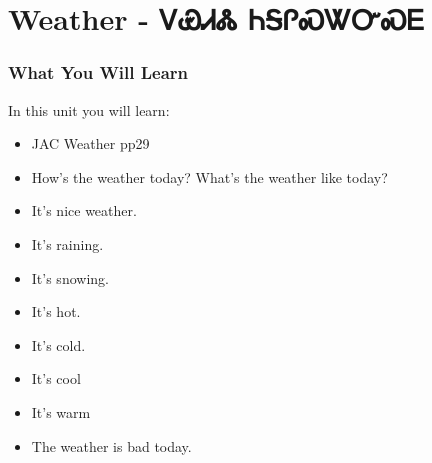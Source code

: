 \chapter*{Weather - ᏙᏯᏗᏜ ᏂᎦᎵᏍᏔᏅᏍᎬ}
\subsection{What You Will Learn}
In this unit you will learn:
\begin{itemize}
\item JAC Weather pp29
\item How's the weather today? What's the weather like today?
\item It's nice weather.
\item It's raining.
\item It's snowing.
\item It's hot.
\item It's cold.
\item It's cool
\item It's warm
\item The weather is bad today.
\end{itemize}\newpage


